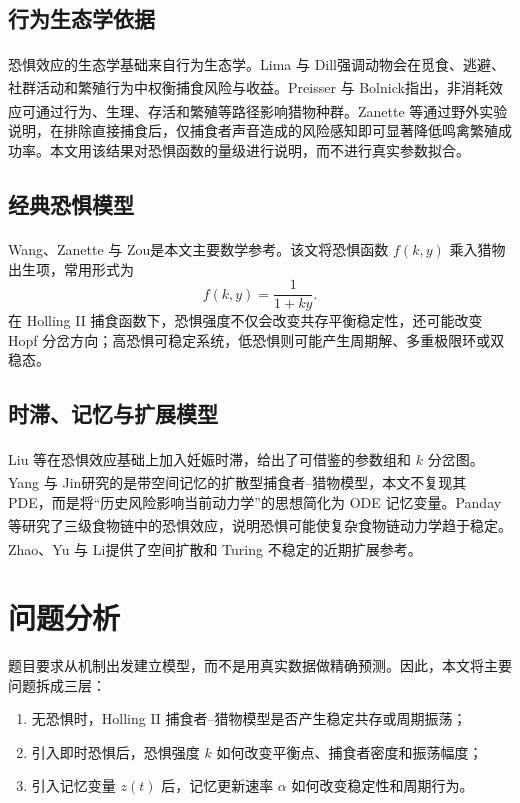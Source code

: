 \documentclass{article}
\newcommand{\upcite}[1]{\textsuperscript{\cite{#1}}}
\begin{document}
\subsection{行为生态学依据}
恐惧效应的生态学基础来自行为生态学。Lima 与 Dill\upcite{lima1990behavioral}强调动物会在觅食、逃避、社群活动和繁殖行为中权衡捕食风险与收益。Preisser 与 Bolnick\upcite{preisser2008many}指出，非消耗效应可通过行为、生理、存活和繁殖等路径影响猎物种群。Zanette 等\upcite{zanette2011perceived}通过野外实验说明，在排除直接捕食后，仅捕食者声音造成的风险感知即可显著降低鸣禽繁殖成功率。本文用该结果对恐惧函数的量级进行说明，而不进行真实参数拟合。

\subsection{经典恐惧模型}
Wang、Zanette 与 Zou\upcite{wang2016modelling}是本文主要数学参考。该文将恐惧函数 $f(k,y)$ 乘入猎物出生项，常用形式为
\[
f(k,y)=\frac{1}{1+ky}.
\]
在 Holling II 捕食函数下，恐惧强度不仅会改变共存平衡稳定性，还可能改变 Hopf 分岔方向；高恐惧可稳定系统，低恐惧则可能产生周期解、多重极限环或双稳态。

\subsection{时滞、记忆与扩展模型}
Liu 等\upcite{liu2021dynamics}在恐惧效应基础上加入妊娠时滞，给出了可借鉴的参数组和 $k$ 分岔图。Yang 与 Jin\upcite{yang2022dynamics}研究的是带空间记忆的扩散型捕食者--猎物模型，本文不复现其 PDE，而是将“历史风险影响当前动力学”的思想简化为 ODE 记忆变量。Panday 等\upcite{panday2018stability}研究了三级食物链中的恐惧效应，说明恐惧可能使复杂食物链动力学趋于稳定。Zhao、Yu 与 Li\upcite{zhao2025dynamics}提供了空间扩散和 Turing 不稳定的近期扩展参考。

\section{问题分析}

题目要求从机制出发建立模型，而不是用真实数据做精确预测。因此，本文将主要问题拆成三层：
\begin{enumerate}[label=(\arabic*)]
    \item 无恐惧时，Holling II 捕食者--猎物模型是否产生稳定共存或周期振荡；
    \item 引入即时恐惧后，恐惧强度 $k$ 如何改变平衡点、捕食者密度和振荡幅度；
    \item 引入记忆变量 $z(t)$ 后，记忆更新速率 $\alpha$ 如何改变稳定性和周期行为。
\end{enumerate}
\end{document}
